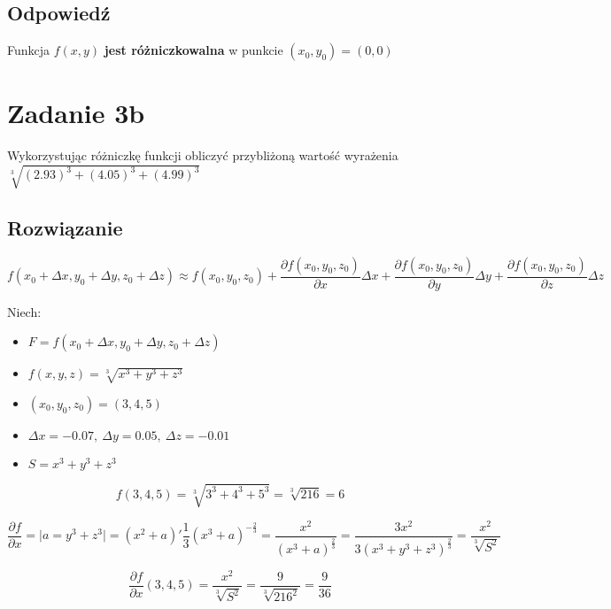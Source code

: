 \documentclass{article}
\newcommand{\partderiv}[2]{\frac{\partial #1}{\partial #2}}
\DeclareMathOperator{\?}{?}
\begin{document}
\subsection*{Odpowiedź}

Funkcja $f(x,y)$ \textbf{jest różniczkowalna} w punkcie $(x_0, y_0) = (0,0)$

\clearpage

\section*{Zadanie 3b}
Wykorzystując różniczkę funkcji obliczyć przybliżoną wartość wyrażenia $\sqrt[3]{(2.93)^3 + (4.05)^3 + (4.99)^3}$

\subsection*{Rozwiązanie}
\begin{equation*}
   f(x_0 + \Delta{x}, y_0 + \Delta{y}, z_0 + \Delta{z}) \approx
   f(x_0, y_0, z_0)
   + \partderiv{f(x_0, y_0, z_0)}{x} \Delta{x}
   + \partderiv{f(x_0, y_0, z_0)}{y} \Delta{y}
   + \partderiv{f(x_0, y_0, z_0)}{z} \Delta{z}
\end{equation*}

Niech:
\begin{itemize}
   \item[] $F = f(x_0 + \Delta{x}, y_0 + \Delta{y}, z_0 + \Delta{z}) $
   \item[] $ f(x,y,z) = \sqrt[3]{x^3 + y^3 + z^3} $
   \item[] $ (x_0, y_0, z_0) = (3,4,5) $
   \item[] $ \Delta{x} = -0.07,\ \Delta{y} = 0.05,\ \Delta{z} = -0.01$
   \item[] $ S = x^3 + y^3 + z^3 $
\end{itemize}

\begin{equation*}
   f(3,4,5) = \sqrt[3]{3^3 + 4^3 + 5^3} = \sqrt[3]{216} = 6
\end{equation*}

\begin{equation*}
   \partderiv{f}{x} = \Big| a = y^3 + z^3 \Big| =
   (x^2 + a)' \frac{1}{3}(x^3+a)^{-\frac{2}{3}} =
   \frac{x^2}{(x^3+a)^{\frac{2}{3}}} =
   \frac{3x^2}{3(x^3+y^3+z^3)^{\frac{2}{3}}} =
   \frac{x^2}{\sqrt[3]{S^2}}
\end{equation*}

\begin{equation*}
   \partderiv{f}{x}(3,4,5) = \frac{x^2}{\sqrt[3]{S^2}} = \frac{9}{\sqrt[3]{216^2}} = \frac{9}{36}
\end{equation*}
\end{document}
